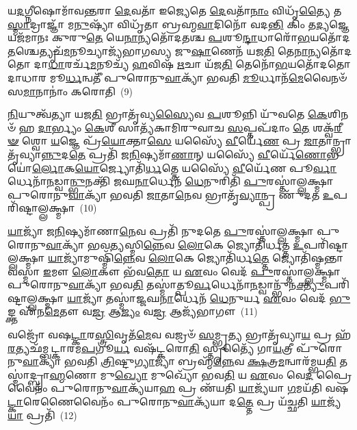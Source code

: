 𑌯\-\ul{𑌦}\-𑌗𑍍𑌨𑍀𑌷𑍋𑌮𑌾᳴𑌵\-\ul{𑌨𑍍𑌤}\-𑌰𑌾 \ul{𑌦𑍇}\-𑌵𑌤𑌾᳴ 𑌇𑌜𑍍𑌯𑍇𑌤𑍇 \ul{𑌦𑍇}\-𑌵𑌤𑌾᳴\-\ul{𑌨𑌾𑌂} 𑌵𑌿𑌧𑍃᳴\-\ul{𑌤𑍍𑌯𑍈} 𑌤\-\ul{𑌸𑍍𑌮𑌾}\-𑌦𑍍𑌰𑌾𑌜𑍍𑌞𑌾᳴ 𑌮\-\ul{𑌨𑍁}\-𑌷𑍍𑌯𑌾᳴ 𑌵𑌿𑌧𑍃᳴𑌤𑌾 𑌬𑍍𑌰𑌹𑍍𑌮\-\ul{𑌵𑌾}\-𑌦𑌿𑌨𑍋᳴ 𑌵𑌦\-\ul{𑌨𑍍𑌤𑌿} 𑌕𑌿𑌂 𑌤\-\ul{𑌦𑍍𑌯}\-𑌜𑍍𑌞𑍇 𑌯𑌜᳴𑌮𑌾𑌨𑌃 𑌕𑍁𑌰𑍁\-\ul{𑌤𑍇} 𑌯𑍇\-\ul{𑌨𑌾}\-𑌨𑍍𑌯𑌤𑍋᳴𑌦𑌤𑌶𑍍𑌚 \ul{𑌪}\-𑌶𑍂\-\ul{𑌨𑍍𑌦𑌾}\-𑌧𑌾𑌰𑍋᳴\-\ul{𑌭}\-𑌯𑌤𑍋᳴𑌦\-\ul{𑌤}\-𑌶𑍍𑌚𑍇𑌤𑍍𑌯𑍃𑌚᳴\-\ul{𑌮}\-𑌨𑍂𑌚𑍍𑌯𑌾𑌜𑍍𑌯᳴𑌭𑌾𑌗𑌸𑍍𑌯 𑌜𑍁\-\ul{𑌷𑌾}\-𑌣𑍇𑌨᳴ 𑌯𑌜\-\ul{𑌤𑌿} 𑌤𑍇\-\ul{𑌨𑌾}\-𑌨𑍍𑌯𑌤𑍋᳴𑌦𑌤𑍋 𑌦𑌾\-\ul{𑌧𑌾}\-𑌰𑌰𑍍𑌚᳴\-\ul{𑌮}\-𑌨𑍂𑌚𑍍𑌯᳴ \ul{𑌹}\-𑌵𑌿𑌷᳴ \ul{𑌋}\-𑌚𑌾 𑌯᳴𑌜\-\ul{𑌤𑌿} 𑌤𑍇𑌨𑍋᳴\-\ul{𑌭}\-𑌯𑌤𑍋᳴𑌦𑌤𑍋 𑌦𑌾𑌧𑌾𑌰 𑌮𑍂\-\ul{𑌰𑍍𑌧}\-𑌨𑍍𑌵𑌤𑍀᳴ 𑌪𑍁𑌰𑍋𑌨𑍁\-\ul{𑌵𑌾}\-𑌕𑍍𑌯𑌾᳴ 𑌭𑌵𑌤𑌿 \ul{𑌮𑍂}\-𑌰𑍍𑌧𑌾𑌨᳴\-\ul{𑌮𑍇}\-𑌵𑍈𑌨𑍞᳴ 𑌸\-\ul{𑌮𑌾}\-𑌨𑌾𑌨𑌾𑌂॑ 𑌕𑌰𑍋𑌤𑌿~(9)

\-\ul{𑌨𑌿}\-𑌯𑍁𑌤𑍍𑌵᳴𑌤𑍍𑌯𑌾 𑌯𑌜\-\ul{𑌤𑌿} 𑌭𑍍𑌰𑌾𑌤𑍃᳴𑌵𑍍𑌯\-\ul{𑌸𑍍𑌯𑍈}\-𑌵 \ul{𑌪}\-𑌶𑍂𑌨𑍍𑌨𑌿 𑌯𑍁᳴𑌵𑌤𑍇 \ul{𑌕𑍇}\-𑌶𑌿𑌨𑍞᳴ 𑌹 \ul{𑌦𑌾}\-𑌰𑍍𑌭𑍍𑌯𑌂 \ul{𑌕𑍇}\-𑌶𑍀 𑌸𑌾𑌤𑍍𑌯᳴𑌕𑌾𑌮𑌿𑌰𑍁𑌵𑌾𑌚 \ul{𑌸}\-𑌪𑍍𑌤𑌪᳴𑌦𑌾𑌂 \ul{𑌤𑍇} 𑌶𑌕𑍍𑌵᳴\-\ul{𑌰𑍀}\-\-\ul{𑍟} 𑌶𑍍𑌵𑍋 \ul{𑌯}\-𑌜𑍍𑌞𑍇 𑌪𑍍𑌰᳴\-\ul{𑌯𑍋}\-𑌕𑍍𑌤𑌾\-\ul{𑌸𑍇} 𑌯𑌸𑍍𑌯𑍈᳴ \ul{𑌵𑍀}\-𑌰𑍍𑌯𑍇᳴\-\ul{𑌣} 𑌪𑍍𑌰 \ul{𑌜𑌾}\-𑌤𑌾𑌨𑍍𑌭𑍍𑌰𑌾𑌤𑍃᳴𑌵𑍍𑌯𑌾\-\ul{𑌨𑍍𑌨𑍁}\-𑌦\-\ul{𑌤𑍇} 𑌪𑍍𑌰𑌤𑌿᳴ 𑌜\-\ul{𑌨𑌿}\-𑌷𑍍𑌯𑌮𑌾᳴\-\ul{𑌣𑌾}\-𑌨𑍍 𑌯𑌸𑍍𑌯𑍈᳴ \ul{𑌵𑍀}\-𑌰𑍍𑌯𑍇᳴\-\ul{𑌣𑍋}\-𑌭𑌯𑍋॑\-\ul{𑌰𑍍𑌲𑍋}\-𑌕\-\ul{𑌯𑍋}\-𑌰𑍍𑌜𑍍𑌯𑍋𑌤𑌿᳴\-\ul{𑌰𑍍𑌧}\-𑌤𑍍𑌤𑍇 𑌯𑌸𑍍𑌯𑍈᳴ \ul{𑌵𑍀}\-𑌰𑍍𑌯𑍇᳴𑌣 𑌪𑍂\-\ul{𑌰𑍍𑌵𑌾}\-𑌰𑍍𑌧𑍇𑌨𑌾᳴\-\ul{𑌨}\-𑌡𑍍𑌵𑌾\-\ul{𑌨𑍍𑌭𑍁}\-𑌨𑌕𑍍𑌤𑌿᳴ 𑌜𑌘\-\ul{𑌨𑌾}\-𑌰𑍍𑌧𑍇𑌨᳴ \ul{𑌧𑍇}\-𑌨𑍁𑌰𑌿𑌤𑌿᳴ \ul{𑌪𑍁}\-𑌰𑌸𑍍𑌤𑌾॑𑌲𑍍𑌲𑌕𑍍𑌷𑍍𑌮𑌾 𑌪𑍁𑌰𑍋𑌨𑍁\-\ul{𑌵𑌾}\-𑌕𑍍𑌯𑌾᳴ 𑌭𑌵𑌤𑌿 \ul{𑌜𑌾}\-𑌤𑌾\-\ul{𑌨𑍇}\-𑌵 𑌭𑍍𑌰𑌾𑌤𑍃᳴\-\ul{𑌵𑍍𑌯𑌾}\-𑌨𑍍𑌪𑍍𑌰 𑌣𑍁᳴𑌦𑌤 \ul{𑌉}\-𑌪𑌰𑌿᳴𑌷𑍍𑌟𑌾𑌲𑍍𑌲𑌕𑍍𑌷𑍍𑌮𑌾~(10)

\-\ul{𑌯𑌾}\-𑌜𑍍𑌯𑌾᳴ 𑌜\-\ul{𑌨𑌿}\-𑌷𑍍𑌯𑌮𑌾᳴𑌣𑌾\-\ul{𑌨𑍇}\-𑌵 𑌪𑍍𑌰𑌤𑌿᳴ 𑌨𑍁𑌦𑌤𑍇 \ul{𑌪𑍁}\-𑌰𑌸𑍍𑌤𑌾॑𑌲𑍍𑌲𑌕𑍍𑌷𑍍𑌮𑌾 𑌪𑍁𑌰𑍋𑌨𑍁\-\ul{𑌵𑌾}\-𑌕𑍍𑌯𑌾᳴ 𑌭𑌵\-\ul{𑌤𑍍𑌯}\-𑌸𑍍𑌮𑌿\-\ul{𑌨𑍍𑌨𑍇}\-𑌵 \ul{𑌲𑍋}\-𑌕𑍇 𑌜𑍍𑌯𑍋𑌤𑌿᳴𑌰𑍍𑌧𑌤𑍍𑌤 \ul{𑌉}\-𑌪𑌰𑌿᳴𑌷𑍍𑌟𑌾𑌲𑍍𑌲𑌕𑍍𑌷𑍍𑌮𑌾 \ul{𑌯𑌾}\-𑌜𑍍𑌯𑌾᳴𑌮𑍁𑌷𑍍𑌮𑌿᳴\-\ul{𑌨𑍍𑌨𑍇}\-𑌵 \ul{𑌲𑍋}\-𑌕𑍇 𑌜𑍍𑌯𑍋𑌤𑌿᳴𑌰𑍍𑌧\-\ul{𑌤𑍍𑌤𑍇} 𑌜𑍍𑌯𑍋𑌤𑌿᳴𑌷𑍍𑌮𑌨𑍍𑌤𑌾𑌵𑌸𑍍𑌮𑌾 \ul{𑌇}\-𑌮𑍗 \ul{𑌲𑍋}\-𑌕𑍗 𑌭᳴𑌵\-\ul{𑌤𑍋} 𑌯 \ul{𑌏}\-𑌵𑌂 𑌵𑍇𑌦᳴ \ul{𑌪𑍁}\-𑌰𑌸𑍍𑌤𑌾॑𑌲𑍍𑌲𑌕𑍍𑌷𑍍𑌮𑌾 𑌪𑍁𑌰𑍋𑌨𑍁\-\ul{𑌵𑌾}\-𑌕𑍍𑌯𑌾᳴ 𑌭𑌵\-\ul{𑌤𑌿} 𑌤𑌸𑍍𑌮𑌾॑𑌤𑍍𑌪𑍂\-\ul{𑌰𑍍𑌵}\-𑌰𑍍𑌧𑍇𑌨𑌾᳴\-\ul{𑌨}\-𑌡𑍍𑌵𑌾𑌨𑍍𑌭𑍁᳴𑌨\-\ul{𑌕𑍍𑌤𑍍𑌯𑍁}\-𑌪𑌰𑌿᳴𑌷𑍍𑌟𑌾𑌲𑍍𑌲𑌕𑍍𑌷𑍍𑌮𑌾 \ul{𑌯𑌾}\-𑌜𑍍𑌯𑌾᳴ 𑌤𑌸𑍍𑌮𑌾॑𑌜𑍍𑌜𑌘\-\ul{𑌨𑌾}\-𑌰𑍍𑌧𑍇𑌨᳴ \ul{𑌧𑍇}\-𑌨𑍁𑌰𑍍𑌯 \ul{𑌏}\-𑌵𑌂 𑌵𑍇𑌦᳴ \ul{𑌭𑍁}\-𑌙𑍍𑌕𑍍𑌤 𑌏᳴𑌨\-\ul{𑌮𑍇}\-𑌤𑍗 𑌵\-\ul{𑌜𑍍𑌰} 𑌆\-\ul{𑌜𑍍𑌯𑌂} 𑌵\-\ul{𑌜𑍍𑌰} 𑌆𑌜𑍍𑌯᳴𑌭𑌾𑌗𑍗~(11)

𑌵𑌜𑍍𑌰𑍋᳴ 𑌵𑌷\-\ul{𑌟𑍍𑌕𑌾}\-𑌰\-\ul{𑌸𑍍𑌤𑍍𑌰𑌿}\-𑌵𑍃𑌤᳴\-\ul{𑌮𑍇}\-𑌵 𑌵𑌜𑍍𑌰𑍞᳴ \ul{𑌸}\-𑌮𑍍𑌭𑍃\-\ul{𑌤𑍍𑌯} 𑌭𑍍𑌰𑌾𑌤𑍃᳴𑌵𑍍𑌯𑌾\-\ul{𑌯} 𑌪𑍍𑌰 𑌹᳴\-\ul{𑌰}\-𑌤𑍍𑌯𑌛᳴𑌮𑍍𑌬𑌟𑍍𑌕𑌾𑌰𑌮\-\ul{𑌪}\-𑌗𑍂\-\ul{𑌰𑍍𑌯} 𑌵𑌷᳴𑌟𑍍𑌕𑌰𑍋\-\ul{𑌤𑌿} 𑌸𑍍𑌤𑍃𑌤𑍍𑌯𑍈᳴ 𑌗𑌾\-\ul{𑌯}\-𑌤𑍍𑌰𑍀 𑌪𑍁᳴𑌰𑍋𑌨𑍁\-\ul{𑌵𑌾}\-𑌕𑍍𑌯𑌾᳴ 𑌭𑌵𑌤𑌿 \ul{𑌤𑍍𑌰𑌿}\-𑌷𑍍𑌟𑍁\-\ul{𑌗𑍍𑌯𑌾}\-𑌜𑍍𑌯𑌾॑ 𑌬𑍍𑌰𑌹𑍍𑌮᳴\-\ul{𑌨𑍍𑌨𑍇}\-𑌵 \ul{𑌕𑍍𑌷}\-𑌤𑍍𑌰\-\ul{𑌮}\-𑌨𑍍𑌵𑌾𑌰᳴𑌮𑍍𑌭𑌯\-\ul{𑌤𑌿} 𑌤𑌸𑍍𑌮𑌾॑𑌦𑍍𑌬𑍍𑌰𑌾\-\ul{𑌹𑍍𑌮}\-𑌣𑍋 𑌮𑍁\-\ul{𑌖𑍍𑌯𑍋} 𑌮𑍁𑌖𑍍𑌯𑍋᳴ 𑌭𑌵\-\ul{𑌤𑌿} 𑌯 \ul{𑌏}\-𑌵𑌂 𑌵𑍇\-\ul{𑌦} 𑌪𑍍𑌰𑍈𑌵𑍈𑌨𑌂᳴ 𑌪𑍁𑌰𑍋𑌨𑍁\-\ul{𑌵𑌾}\-𑌕𑍍𑌯᳴𑌯𑌾\-\ul{𑌹} 𑌪𑍍𑌰 𑌣᳴𑌯𑌤𑌿 \ul{𑌯𑌾}\-𑌜𑍍𑌯᳴𑌯𑌾 \ul{𑌗}\-𑌮𑌯᳴𑌤𑌿 𑌵𑌷\-\ul{𑌟𑍍𑌕𑌾}\-𑌰𑍇𑌣𑍈𑌵𑍈𑌨𑌂᳴ 𑌪𑍁𑌰𑍋𑌨𑍁\-\ul{𑌵𑌾}\-𑌕𑍍𑌯᳴𑌯𑌾 𑌦\-\ul{𑌤𑍍𑌤𑍇} 𑌪𑍍𑌰 𑌯᳴𑌚𑍍𑌛𑌤𑌿 \ul{𑌯𑌾}\-𑌜𑍍𑌯᳴\-\ul{𑌯𑌾} 𑌪𑍍𑌰𑌤𑌿᳴~(12)

